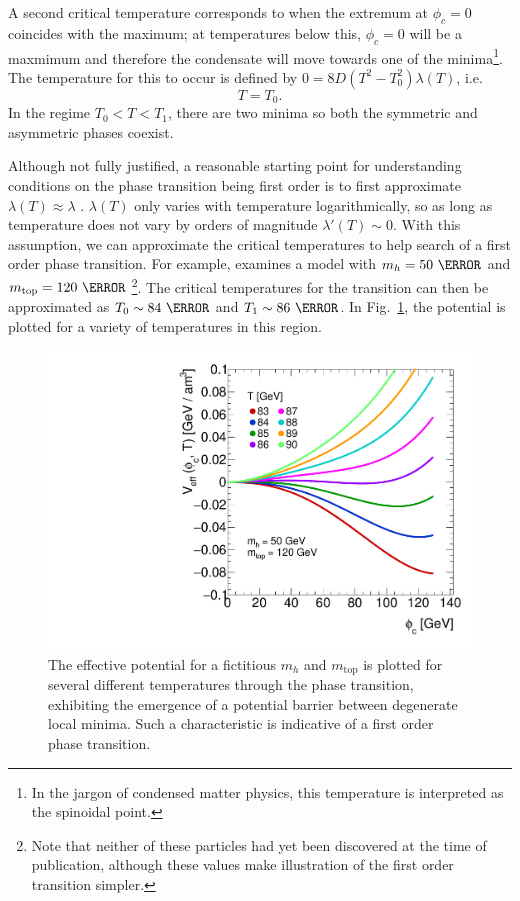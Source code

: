 \documentclass[%
 reprint,
nofootinbib,
 amsmath,amssymb,
 aps,
floatfix,
]{revtex4-1}
\begin{document}
A second critical temperature corresponds to when the extremum at $\phi_c = 0$ coincides with the maximum; at temperatures below this, $\phi_c = 0$ will be a maxmimum and therefore the condensate will move towards one of the minima\footnote{In the jargon of condensed matter physics, this temperature is interpreted as the spinoidal point.}.
The temperature for this to occur is defined by $0 = 8D\left(T^2-T_0^2\right)\lambda(T)$, i.e.
\begin{equation}
    T = T_0.
\end{equation}
In the regime $T_0 < T < T_1$, there are two minima so both the symmetric and asymmetric phases coexist.

Although not fully justified, a reasonable starting point for understanding conditions on the phase transition being first order is to first approximate $\lambda(T) \approx \lambda$ \cite{long12}.
$\lambda(T)$ only varies with temperature logarithmically, so as long as temperature does not vary by orders of magnitude $\lambda'(T) \sim 0$.
With this assumption, we can approximate the critical temperatures to help search of a first order phase transition.
For example, \cite{dine92} examines a model with $m_h=50~\GeV$ and $m_\text{top}=120~\GeV$ \footnote{Note that neither of these particles had yet been discovered at the time of publication, although these values make illustration of the first order transition simpler.}.
The critical temperatures for the transition can then be approximated as $T_0 \sim 84~\GeV$ and $T_1 \sim 86~\GeV$.
In Fig.~\ref{fig:fopt}, the potential is plotted for a variety of temperatures in this region.
\begin{figure}
    \centering
    \includegraphics[width=\linewidth]{fopt_effpot.pdf}
    \caption{The effective potential for a fictitious $m_h$ and $m_\text{top}$ is plotted for several different temperatures through the phase transition, exhibiting the emergence of a potential barrier between degenerate local minima. Such a characteristic is indicative of a first order phase transition.}
    \label{fig:fopt}
\end{figure}
\end{document}
